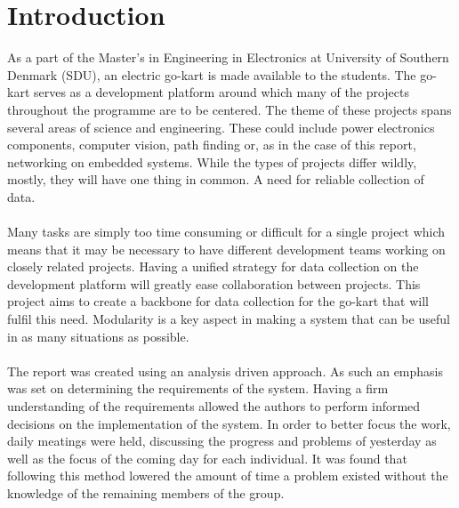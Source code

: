 \section{Introduction} %
\label{sec:introduction}
As a part of the Master's in Engineering in Electronics at University of Southern Denmark (SDU), an electric go-kart is made available to the students.
The go-kart serves as a development platform around which many of the projects throughout the programme are to be centered.
The theme of these projects spans several areas of science and engineering.
These could include power electronics components, computer vision, path finding or, as in the case of this report, networking on embedded systems.
While the types of projects differ wildly, mostly, they will have one thing in common.
A need for reliable collection of data.
\\~\\
Many tasks are simply too time consuming or difficult for a single project which means that it may be necessary to have different development teams working on closely related projects.
Having a unified strategy for data collection on the development platform will greatly ease collaboration between projects.
This project aims to create a backbone for data collection for the go-kart that will fulfil this need.
Modularity is a key aspect in making a system that can be useful in as many situations as possible.
\\~\\
The report was created using an analysis driven approach.
As such an emphasis was set on determining the requirements of the system.
Having a firm understanding of the requirements allowed the authors to perform informed decisions on the implementation of the system.
In order to better focus the work, daily meatings were held, discussing the progress and problems of yesterday as well as the focus of the coming day for each individual.
It was found that following this method lowered the amount of time a problem existed without the knowledge of the remaining members of the group.
